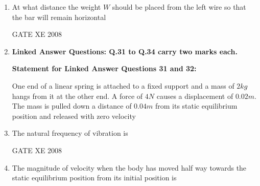 \documentclass[12pt]{article}
\begin{document}
\begin{enumerate}
\item At what distance the weight $W$ should be placed from the left wire so that the bar will remain horizontal  

\begin{enumerate}
\end{enumerate}

GATE XE 2008

\item[] \textbf{\Large Linked Answer Questions: Q.31 to Q.34 carry two marks each.}

\textbf{Statement for Linked Answer Questions 31 and 32:}

One end of a linear spring is attached to a fixed support and a mass of $2 kg$ hangs from it at the other end. A force of $4 N$ causes a displacement of $0.02m$. The mass is pulled down a distance of $0.04 m$ from its static equilibrium position and released with zero velocity


\item The natural frequency of vibration is  

\begin{enumerate}
\end{enumerate}

GATE XE 2008

\item The magnitude of velocity when the body has moved half way towards the static equilibrium position from its initial position is  

\begin{enumerate}
\end{enumerate}


\end{enumerate}
\end{document}
